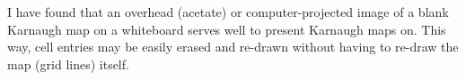 I have found that an overhead (acetate) or computer-projected image of a blank Karnaugh map on a whiteboard serves well to present Karnaugh maps on.  This way, cell entries may be easily erased and re-drawn without having to re-draw the map (grid lines) itself.




